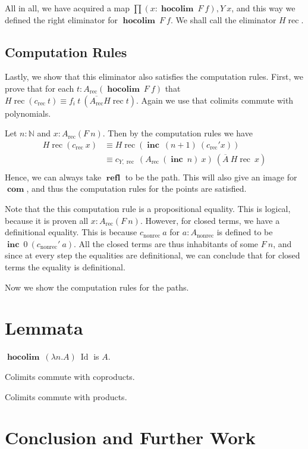 \documentclass[a4paper,UKenglish]{lipics-v2016}
\newcommand{\frec}[0]{\!\operatorname{rec}}
\newcommand{\rec}[0]{\operatorname{rec}}
\newcommand{\nonrec}[0]{\operatorname{nonrec}}
\newcommand{\refl}[0]{\operatorname{\textbf{refl}}}
\newcommand{\hocolim}[0]{\operatorname{\textbf{hocolim}}}
\newcommand{\inc}[0]{\operatorname{\textbf{inc}}}
\newcommand{\com}[0]{\operatorname{\textbf{com}}}
\begin{document}
All in all, we have acquired a map $\prod (x : \hocolim \> F \> f), Y \> x$, and this way we defined the right eliminator for $\hocolim \> F \> f$.
We shall call the eliminator $H\frec$.

\subsection{Computation Rules}
Lastly, we show that this eliminator also satisfies the computation rules.
First, we prove that for each $t : A_{\rec}(\hocolim \> F \> f)$ that $H\frec(c_{\rec} \> t) \equiv f_i \> t \> (\overline{A_{\rec}} H\frec t)$.
Again we use that colimits commute with polynomials.

Let $n : \mathbb{N}$ and $x : A_{\rec}(F \> n)$.
Then by the computation rules we have
\begin{equation*}
\begin{split}
H\frec(c_{\rec} \> x) 
&\equiv H\frec(\inc \> (n+1) \> (c_{\rec}' x)) \\
&\equiv c_{Y,\rec} \> (A_{\rec} \> (\inc \> n) \> x) \> (\overline{A} \> H\frec \> x)\\
\end{split}
\end{equation*}
Hence, we can always take $\refl$ to be the path.
This will also give an image for $\com$, and thus the computation rules for the points are satisfied.

Note that the this computation rule is a propositional equality.
This is logical, because it is proven all $x : A_{\rec}(F \> n)$.
However, for closed terms, we have a definitional equality.
This is because $c_{\nonrec} \> a$ for $a : A_{\nonrec}$ is defined to be$\inc \> 0 \> (c_{\nonrec}' \> a)$.
All the closed terms are thus inhabitants of some $F \> n$, and since at every step the equalities are definitional, we can conclude that for closed terms the equality is definitional.

Now we show the computation rules for the paths.


\section{Lemmata}
\label{sec:Lemmata}

\begin{lemma}
$\hocolim \> (\lambda n . A) \> \operatorname{Id}$ is $A$.
\end{lemma}

\begin{lemma}
Colimits commute with coproducts.
\end{lemma}

\begin{lemma}
Colimits commute with products.
\end{lemma}

\section{Conclusion and Further Work}



\nocite{*}





\end{document}

